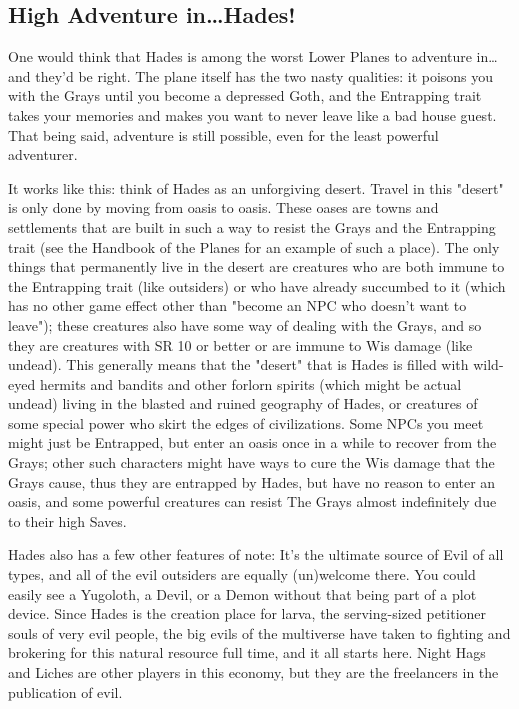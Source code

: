 \subsection{High Adventure in\ldots Hades!}

One would think that Hades is among the worst Lower Planes to adventure in\ldots and they'd be right. The plane itself has the two nasty qualities: it poisons you with the Grays until you become a depressed Goth, and the Entrapping trait takes your memories and makes you want to never leave like a bad house guest. That being said, adventure is still possible, even for the least powerful adventurer.

It works like this: think of Hades as an unforgiving desert. Travel in this "desert" is only done by moving from oasis to oasis. These oases are towns and settlements that are built in such a way to resist the Grays and the Entrapping trait (see the Handbook of the Planes for an example of such a place). The only things that permanently live in the desert are creatures who are both immune to the Entrapping trait (like outsiders) or who have already succumbed to it (which has no other game effect other than "become an NPC who doesn't want to leave"); these creatures also have some way of dealing with the Grays, and so they are creatures with SR 10 or better or are immune to Wis damage (like undead). This generally means that the "desert" that is Hades is filled with wild-eyed hermits and bandits and other forlorn spirits (which might be actual undead) living in the blasted and ruined geography of Hades, or creatures of some special power who skirt the edges of civilizations. Some NPCs you meet might just be Entrapped, but enter an oasis once in a while to recover from the Grays; other such characters might have ways to cure the Wis damage that the Grays cause, thus they are entrapped by Hades, but have no reason to enter an oasis, and some powerful creatures can resist The Grays almost indefinitely due to their high Saves.

Hades also has a few other features of note: It's the ultimate source of Evil of all types, and all of the evil outsiders are equally (un)welcome there. You could easily see a Yugoloth, a Devil, or a Demon without that being part of a plot device. Since Hades is the creation place for larva, the serving-sized petitioner souls of very evil people, the big evils of the multiverse have taken to fighting and brokering for this natural resource full time, and it all starts here. Night Hags and Liches are other players in this economy, but they are the freelancers in the publication of evil.

